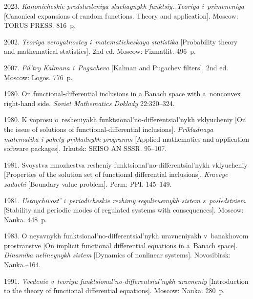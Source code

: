 \begin{multicols}{2}
{{\begin{thebibliography}{99}
 2023. 
\textit{Kanonicheskie predstavleniya sluchaynykh funktsiy. Teoriya i~primeneniya} 
[Canonical expansions of random functions. Theory and application]. 
Moscow: TORUS PRESS. 816~p.




 2002. 
\textit{Teoriya veroyatnostey i~ma\-te\-ma\-ti\-che\-skaya statistika} [Probability theory and mathematical statistics]. 2nd ed. 
Moscow: Fizmatlit. 496~p.

 2007. 
\textit{Fil'try Kalmana i~Pugacheva} [Kalman and Pugachev filters]. 2nd ed. 
Moscow: Logos. 776~p.

 1980.
On functional-differential inclusions in a Banach space with a~nonconvex right-hand side. 
\textit{Soviet Mathematics Doklady} 
22:320--324.

 1980.
K voprosu o~resheniyakh funktsional'no-differentsial'nykh  vklyucheniy [On the issue of solutions of functional-differential inclusions].
\textit{Prikladnaya matematika i pakety prikladnykh programm} [Applied mathematics and application software packages]. 
Irkutsk: SEISO AN SSSR. 95--107.

 1981. 
Svoystva mnozhestva resheniy funktsional'no-differentsial'nykh vklyucheniy [Properties of the solution set of functional differential inclusions]. 
\textit{Kraevye zadachi} [Boundary value problem]. Perm: PPI. 145--149.



 1981.
\textit{Ustoychivost' i~periodicheskie rezhimy reguliruemykh sistem s~posledstviem} [Stability and periodic modes of regulated systems with consequences]. 
Moscow: Nauka. 448~p.

 1983.
O neyavnykh funktsional'no-differentsial'nykh uravneniyakh v~banakhovom pro\-stran\-st\-ve [On implicit functional differential equations in a~Banach space].
\textit{Dinamika nelineynykh sistem} [Dynamics of nonlinear systems]. 
Novosibirsk: Nauka.--164.

 1991.
\textit{Vvedenie v~teoriyu funktsional'no-differentsial'nykh uravneniy} [Introduction to the theory of functional differential equations]. 
Moscow: Nauka. 280~p.
 


\end{thebibliography}

 }
 }

\end{multicols}

